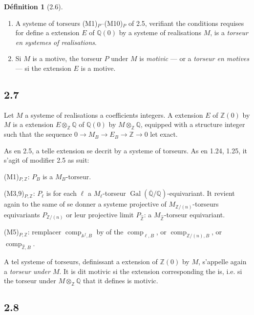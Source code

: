 \documentclass[12pt,a4paper]{article}
\theoremstyle{plain}
\theoremstyle{definition}
\newtheorem{definition}[theorem]{D\'efinition}
\theoremstyle{remark}
\DeclareMathOperator{\Gal}{Gal}
\providecommand{\Gal}{\operatorname{Gal}}
\providecommand{\comp}{\operatorname{comp}}
\begin{document}
\begin{definition}[2.6]\label{def:2.6}
\leavevmode
\begin{enumerate}[label=(\roman*)]
\item A systeme of torseurs (M1)$_P$--(M10)$_P$ of 2.5, verifiant the conditions
requises for define a extension $E$ of $\mathbb{Q}(0)$ by a systeme of
realisations $M$, is a \emph{torseur en systemes of realisations}.
\item Si $M$ is a motive, the torseur $P$ under $M$ is \emph{motivic} --- or a
\emph{torseur en motives} --- si the extension $E$ is a motive.
\end{enumerate}
\end{definition}

\subsection*{2.7}

Let $M$ a systeme of realisations a coefficients integers. A extension $E$ of
$\mathbb{Z}(0)$ by $M$ is a extension $E \otimes_{\mathbb{Z}} \mathbb{Q}$ of
$\mathbb{Q}(0)$ by $M \otimes_{\mathbb{Z}} \mathbb{Q}$, equipped with a structure integer
such that the sequence $0 \to M_B \to E_B \to \mathbb{Z} \to 0$ let exact.

As en 2.5, a telle extension se decrit by a systeme of torseurs. As en
1.24, 1.25, it s'agit of modifier 2.5 as suit:

(M1)$_{P,\mathbb{Z}}$: $P_B$ is a $M_B$-torseur.

(M3,9)$_{P,\mathbb{Z}}$: $P_\ell$ is for each $\ell$ a $M_\ell$-torseur
$\Gal(\overline{\mathbb{Q}}/\mathbb{Q})$-equivariant. It revient again to the same of se
donner a systeme projective of $M_{\mathbb{Z}/(n)}$-torseurs equivariants
$P_{\mathbb{Z}/(n)}$ or leur projective limit $P_{\hat{\mathbb{Z}}}$: a
$M_{\hat{\mathbb{Z}}}$-torseur equivariant.

(M5)$_{P,\mathbb{Z}}$: remplacer $\comp_{\mathbb{A}^f,B}$ by of the
$\comp_{\ell,B}$, or $\comp_{\mathbb{Z}/(n),B}$, or $\comp_{\hat{\mathbb{Z}},B}$.

A tel systeme of torseurs, definissant a extension of $\mathbb{Z}(0)$ by $M$,
s'appelle again a \emph{torseur under $M$}. It is dit motivic si the extension
corresponding the is, i.e. si the torseur under $M \otimes_{\mathbb{Z}} \mathbb{Q}$ that it defines
is motivic.

\subsection*{2.8}
\end{document}
